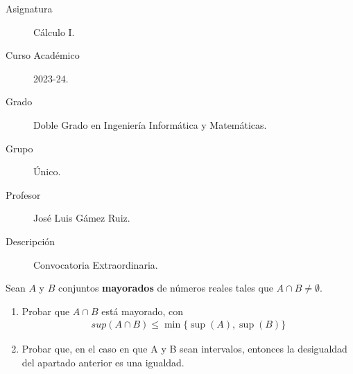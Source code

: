 \documentclass[12pt]{article}
\begin{document}

    
    

    \begin{description}
        \item[Asignatura] Cálculo I.
        \item[Curso Académico] 2023-24.
        \item[Grado] Doble Grado en Ingeniería Informática y Matemáticas.
        \item[Grupo] Único.
        \item[Profesor] José Luis Gámez Ruiz.
        \item[Descripción] Convocatoria Extraordinaria.
    \end{description}
    \newpage

    \begin{ejercicio}[2 puntos]
        Sean $A$ y $B$ conjuntos \textbf{mayorados} de números reales tales que $A \cap B \neq \emptyset$.

        \begin{enumerate}
            \item Probar que $A \cap B$ está mayorado, con 
            \begin{gather*}
                sup(A \cap B) \leq \min\{\sup(A), \sup(B)\}
            \end{gather*}

            \item Probar que, en el caso en que A y B sean intervalos, entonces la desigualdad del apartado anterior es una igualdad.
        \end{enumerate}
    \end{ejercicio}
\end{document}
